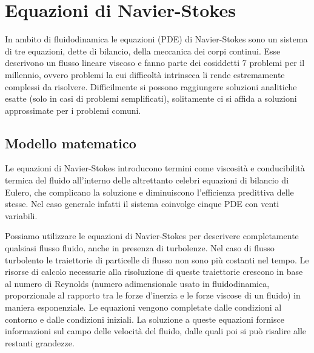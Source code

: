 \section{Equazioni di Navier-Stokes}\label{navierstokes}
In ambito di fluidodinamica le equazioni (PDE) di Navier-Stokes sono un sistema di tre equazioni, dette di bilancio, della meccanica dei corpi continui.
Esse descrivono un flusso lineare viscoso e fanno parte dei cosiddetti 7 problemi per il millennio, ovvero problemi la cui difficoltà intrinseca li rende estremamente complessi da risolvere.
Difficilmente si possono raggiungere soluzioni analitiche esatte (solo in casi di problemi semplificati), solitamente ci si affida a soluzioni approssimate per i problemi comuni.

    \subsection{Modello matematico}
    Le equazioni di Navier-Stokes introducono termini come viscosità e conducibilità termica del fluido all'interno delle altrettanto celebri equazioni di bilancio di Eulero,
    che complicano la soluzione e diminuiscono l'efficienza predittiva delle stesse. Nel caso generale infatti il sistema coinvolge cinque PDE con venti variabili.

    Possiamo utilizzare le equazioni di Navier-Stokes per descrivere completamente qualsiasi flusso fluido, anche in presenza di turbolenze.
    Nel caso di flusso turbolento le traiettorie di particelle di flusso non sono più costanti nel tempo.
    Le risorse di calcolo necessarie alla risoluzione di queste traiettorie crescono in base al numero di Reynolds (numero adimensionale usato in fluidodinamica, proporzionale al rapporto tra le forze d'inerzia
    e le forze viscose di un fluido) in maniera esponenziale. Le equazioni vengono completate dalle condizioni al contorno e dalle condizioni iniziali.
    La soluzione a queste equazioni fornisce informazioni sul campo delle velocità del fluido, dalle quali poi si può risalire alle restanti grandezze.

